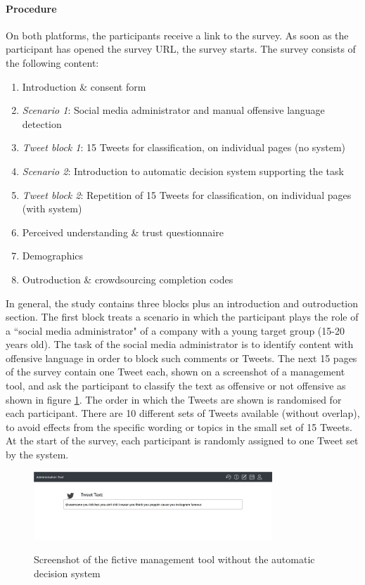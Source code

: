 \paragraph{Procedure}
On both platforms, the participants receive a link to the survey. As soon as the participant has opened the survey URL, the survey starts. The survey consists of the following content:
\begin{enumerate}
	\item Introduction \& consent form
	\item \textit{Scenario 1}: Social media administrator and manual offensive language detection
	\item \textit{Tweet block 1}: 15 Tweets for classification, on individual pages (no system)
	\item \textit{Scenario 2}: Introduction to automatic decision system supporting the task
	\item \textit{Tweet block 2}: Repetition of 15 Tweets for classification, on individual pages (with system)
	\item Perceived understanding \& trust questionnaire
	\item Demographics
	\item Outroduction \& crowdsourcing completion codes
\end{enumerate}
In general, the study contains three blocks plus an introduction and outroduction section. The first block treats a scenario in which the participant plays the role of a ``social media administrator" of a company with a young target group (15-20 years old). The task of the social media administrator is to identify content with offensive language in order to block such comments or Tweets. The next 15 pages of the survey contain one Tweet each, shown on a screenshot of a management tool, and ask the participant to classify the text as offensive or not offensive as shown in figure \ref{fig:survey_tools1}. The order in which the Tweets are shown is randomised for each participant. There are 10 different sets of Tweets available (without overlap), to avoid effects from the specific wording or topics in the small set of 15 Tweets. At the start of the survey, each participant is randomly assigned to one Tweet set by the system.\newline
\begin{figure} [H]
	\centering
	\includegraphics[width=0.8\textwidth]{img/neu_5_13.JPG}\\
	\caption{Screenshot of the fictive management tool without the automatic decision system}
	\label{fig:survey_tools1}
\end{figure}

